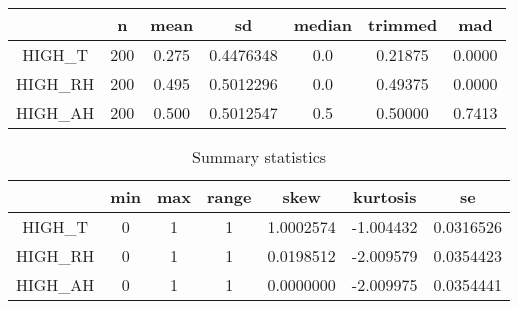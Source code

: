 \begin{table}[H]
  \centering
  \begin{tabular}{|c|c|c|c|c|c|c|}
    \hline
      & n & mean & sd & median & trimmed & mad\\
    \hline
    HIGH\_T  & 200 & 0.275 & 0.4476348 & 0.0 & 0.21875 & 0.0000\\
    \hline
    HIGH\_RH  & 200 & 0.495 & 0.5012296 & 0.0 & 0.49375 & 0.0000\\
    \hline
    HIGH\_AH  & 200 & 0.500 & 0.5012547 & 0.5 & 0.50000 & 0.7413\\
    \hline
  \end{tabular}
\end{table}

\begin{table}[H]
  \centering
  \begin{tabular}{|c|c|c|c|c|c|c|}
    \hline
      & min & max & range & skew & kurtosis & se\\
    \hline
    HIGH\_T & 0 & 1 & 1 & 1.0002574 & -1.004432 & 0.0316526\\
    \hline
    HIGH\_RH & 0 & 1 & 1 & 0.0198512 & -2.009579 & 0.0354423\\
    \hline
    HIGH\_AH & 0 & 1 & 1 & 0.0000000 & -2.009975 & 0.0354441\\
    \hline
  \end{tabular}

  \caption{Summary statistics}
\end{table}
